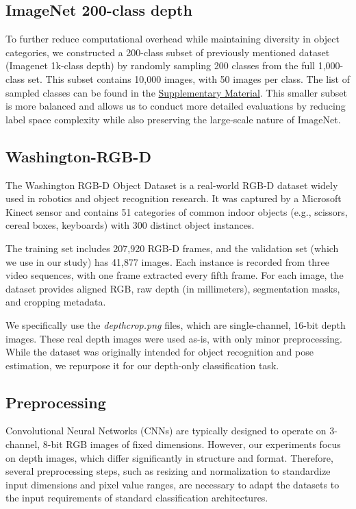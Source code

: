 \subsection{ImageNet 200-class depth}
To further reduce computational overhead while maintaining diversity in object categories, we constructed a 200-class subset of previously mentioned dataset (Imagenet 1k-class depth) by randomly sampling 200 classes from the full 1,000-class set. This subset contains 10,000 images, with 50 images per class. The list of sampled classes can be found in the \href{https://gitlab.com/dariofurlan/vcs-2425/}{Supplementary Material}. This smaller subset is more balanced and allows us to conduct more detailed evaluations by reducing label space complexity while also preserving the large-scale nature of ImageNet.

\subsection{Washington-RGB-D}
The Washington RGB-D Object Dataset \cite{washington-rgbd} is a real-world RGB-D dataset widely used in robotics and object recognition research. It was captured by a Microsoft Kinect sensor and contains 51 categories of common indoor objects (e.g., scissors, cereal boxes, keyboards) with 300 distinct object instances.

The training set includes 207,920 RGB-D frames, and the validation set (which we use in our study) has 41,877 images. Each instance is recorded from three video sequences, with one frame extracted every fifth frame. For each image, the dataset provides aligned RGB, raw depth (in millimeters), segmentation masks, and cropping metadata.

We specifically use the \textit{depthcrop.png} files, which are single-channel, 16-bit depth images. These real depth images were used as-is, with only minor preprocessing. While the dataset was originally intended for object recognition and pose estimation, we repurpose it for our depth-only classification task. 

\subsection{Preprocessing}

Convolutional Neural Networks (CNNs) are typically designed to operate on 3-channel, 8-bit RGB images of fixed dimensions. However, our experiments focus on depth images, which differ significantly in structure and format. Therefore, several preprocessing steps, such as resizing and normalization to standardize input dimensions and pixel value ranges, are necessary to adapt the datasets to the input requirements of standard classification architectures.

